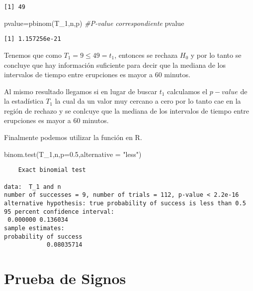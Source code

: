 \documentclass[
  a4paper,
  oneside,
  openany]{book}
\newenvironment{Shaded}{\begin{snugshade}}{\end{snugshade}}
\newcommand{\AttributeTok}[1]{\textcolor[rgb]{0.77,0.63,0.00}{#1}}
\newcommand{\CommentTok}[1]{\textcolor[rgb]{0.56,0.35,0.01}{\textit{#1}}}
\newcommand{\FloatTok}[1]{\textcolor[rgb]{0.00,0.00,0.81}{#1}}
\newcommand{\FunctionTok}[1]{\textcolor[rgb]{0.00,0.00,0.00}{#1}}
\newcommand{\NormalTok}[1]{#1}
\newcommand{\OtherTok}[1]{\textcolor[rgb]{0.56,0.35,0.01}{#1}}
\newcommand{\StringTok}[1]{\textcolor[rgb]{0.31,0.60,0.02}{#1}}
\begin{document}
\begin{verbatim}
[1] 49
\end{verbatim}

\begin{Shaded}
\begin{Highlighting}[]
\NormalTok{pvalue}\OtherTok{=}\FunctionTok{pbinom}\NormalTok{(T\_1,n,p)     }\CommentTok{\#P{-}value correspondiente}
\NormalTok{pvalue}
\end{Highlighting}
\end{Shaded}

\begin{verbatim}
[1] 1.157256e-21
\end{verbatim}

Tenemos que como \(T_1=9\leq 49 =t_1\), entonces se rechaza \(H_0\) y por lo tanto se concluye que hay información suficiente para decir que la mediana de los intervalos de tiempo entre erupciones es mayor a 60 minutos.

Al mismo resultado llegamos si en lugar de buscar \(t_1\) calculamos el \(p-value\) de la estadística \(T_1\) la cual da un valor muy cercano a cero por lo tanto cae en la región de rechazo y se conlcuye que la mediana de los intervalos de tiempo entre erupciones es mayor a 60 minutos.

Finalmente podemos utilizar la función en R.

\begin{Shaded}
\begin{Highlighting}[]
\FunctionTok{binom.test}\NormalTok{(T\_1,n,}\AttributeTok{p=}\FloatTok{0.5}\NormalTok{,}\AttributeTok{alternative =} \StringTok{"less"}\NormalTok{)}
\end{Highlighting}
\end{Shaded}

\begin{verbatim}
    Exact binomial test

data:  T_1 and n
number of successes = 9, number of trials = 112, p-value < 2.2e-16
alternative hypothesis: true probability of success is less than 0.5
95 percent confidence interval:
 0.000000 0.136034
sample estimates:
probability of success 
            0.08035714 
\end{verbatim}

\hypertarget{prueba-de-signos}{%
\chapter{Prueba de Signos}\label{prueba-de-signos}}
\end{document}

